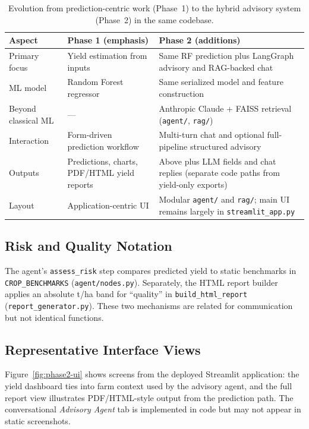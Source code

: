 \documentclass[12pt,a4paper]{article}
\begin{document}
\begin{table}[H]
\centering
\caption{Evolution from prediction-centric work (Phase~1) to the hybrid advisory system (Phase~2) in the same codebase.}
\label{tab:phase2-vs-phase1}
\renewcommand{\arraystretch}{1.22}
\begin{tabularx}{\textwidth}{L{2.9cm} X X}
\toprule
{}
\color{white}\textbf{Aspect} &
\color{white}\textbf{Phase 1 (emphasis)} &
\color{white}\textbf{Phase 2 (additions)} \\
\midrule
{}
Primary focus &
Yield estimation from inputs &
Same RF prediction plus LangGraph advisory and RAG-backed chat \\
ML model &
Random Forest regressor &
Same serialized model and feature construction \\
Beyond classical ML &
--- &
Anthropic Claude + FAISS retrieval (\texttt{agent/}, \texttt{rag/}) \\
Interaction &
Form-driven prediction workflow &
Multi-turn chat and optional full-pipeline structured advisory \\
Outputs &
Predictions, charts, PDF/HTML yield reports &
Above plus LLM fields and chat replies (separate code paths from yield-only exports) \\
Layout &
Application-centric UI &
Modular \texttt{agent/} and \texttt{rag/}; main UI remains largely in \texttt{streamlit\_app.py} \\
\bottomrule
\end{tabularx}
\end{table}

\subsection{Risk and Quality Notation}

The agent's \texttt{assess\_risk} step compares predicted yield to static
benchmarks in \texttt{CROP\_BENCHMARKS} (\texttt{agent/nodes.py}). Separately, the
HTML report builder applies an absolute t/ha band for ``quality'' in
\texttt{build\_html\_report} (\texttt{report\_generator.py}). These two mechanisms
are related for communication but not identical functions.

\subsection{Representative Interface Views}

Figure~\ref{fig:phase2-ui} shows screens from the deployed Streamlit application:
the yield dashboard ties into farm context used by the advisory agent, and the
full report view illustrates PDF/HTML-style output from the prediction path.
The conversational \emph{Advisory Agent} tab is implemented in code but may not
appear in static screenshots.
\end{document}
